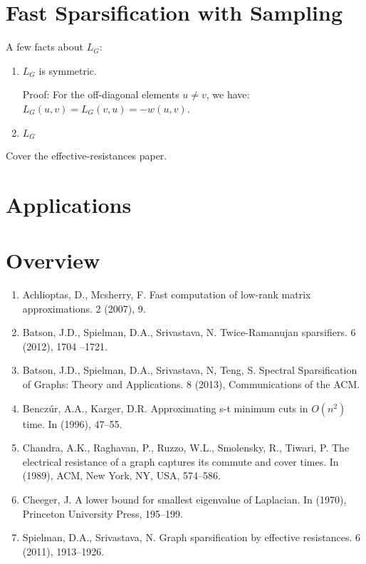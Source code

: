 \documentclass{article}
\begin{document}
\section{Fast Sparsification with Sampling}

A few facts about $L_G$:
\begin{enumerate}[1.]
    \item $L_G$ is symmetric.

        Proof: For the off-diagonal elements $u \not= v$, we have: $L_G(u,
        v) = L_G(v, u) = -w(u, v)$.

    \item $L_G$ 
\end{enumerate}

Cover the effective-resistances paper.

\section{Applications}

\section{Overview}

\cite{CourantFischer}




\begin{enumerate}[1.]
    \item Achlioptas, D., Mcsherry, F. Fast computation of low-rank matrix
        approximations. 2 (2007), 9.

    \item Batson, J.D., Spielman, D.A., Srivastava, N.  Twice-Ramanujan
        sparsifiers. 6 (2012), 1704 –1721.

    \item Batson, J.D., Spielman, D.A., Srivastava, N, Teng, S.  Spectral
        Sparsification of Graphs: Theory and Applications. 8 (2013),
        Communications of the ACM.

    \item Bencz\'{u}r, A.A., Karger, D.R.  Approximating s-t minimum cuts in
        $O(n^2)$ time. In (1996), 47–55.

    \item Chandra, A.K., Raghavan, P., Ruzzo, W.L., Smolensky, R., Tiwari,
        P.  The electrical resistance of a graph captures its commute and
        cover times. In (1989), ACM, New York, NY, USA, 574–586.

    \item Cheeger, J. A lower bound for smallest eigenvalue of Laplacian. In
        (1970), Princeton University Press, 195–199.

    \item Spielman, D.A., Srivastava, N. Graph sparsification by effective
        resistances.  6 (2011), 1913–1926.
\end{enumerate}
\end{document}
